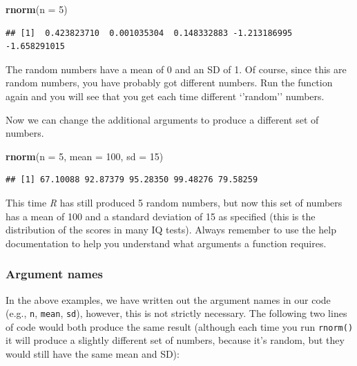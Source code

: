 \documentclass[
]{scrartcl}
\newenvironment{Shaded}{\begin{snugshade}}{\end{snugshade}}
\newcommand{\DataTypeTok}[1]{\textcolor[rgb]{0.13,0.29,0.53}{#1}}
\newcommand{\DecValTok}[1]{\textcolor[rgb]{0.00,0.00,0.81}{#1}}
\newcommand{\KeywordTok}[1]{\textcolor[rgb]{0.13,0.29,0.53}{\textbf{#1}}}
\newcommand{\NormalTok}[1]{#1}
\begin{document}
\begin{Shaded}
\begin{Highlighting}[]
\KeywordTok{rnorm}\NormalTok{(}\DataTypeTok{n =} \DecValTok{5}\NormalTok{)}
\end{Highlighting}
\end{Shaded}

\begin{verbatim}
## [1]  0.423823710  0.001035304  0.148332883 -1.213186995 -1.658291015
\end{verbatim}

The random numbers have a mean of 0 and an SD of 1. Of course, since this are random numbers, you have probably got different numbers. Run the function again and you will see that you get each time different `'random'' numbers.

Now we can change the additional arguments to produce a different set of numbers.

\begin{Shaded}
\begin{Highlighting}[]
\KeywordTok{rnorm}\NormalTok{(}\DataTypeTok{n =} \DecValTok{5}\NormalTok{, }\DataTypeTok{mean =} \DecValTok{100}\NormalTok{, }\DataTypeTok{sd =} \DecValTok{15}\NormalTok{)}
\end{Highlighting}
\end{Shaded}

\begin{verbatim}
## [1] 67.10088 92.87379 95.28350 99.48276 79.58259
\end{verbatim}

This time \emph{R} has still produced 5 random numbers, but now this set of numbers has a mean of 100 and a standard deviation of 15 as specified (this is the distribution of the scores in many IQ tests). Always remember to use the help documentation to help you understand what arguments a function requires.

\hypertarget{argument-names}{%
\subsubsection{Argument names}\label{argument-names}}

In the above examples, we have written out the argument names in our code (e.g., \texttt{n}, \texttt{mean}, \texttt{sd}), however, this is not strictly necessary. The following two lines of code would both produce the same result (although each time you run \texttt{rnorm()} it will produce a slightly different set of numbers, because it's random, but they would still have the same mean and SD):
\end{document}
